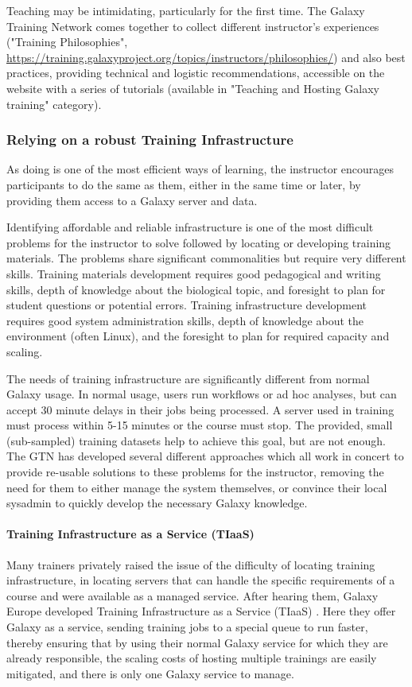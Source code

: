 \documentclass[10pt,letterpaper]{article}
\begin{document}
Teaching may be intimidating, particularly for the first time. The Galaxy Training Network comes together to collect different instructor’s experiences ("Training Philosophies", \url{https://training.galaxyproject.org/topics/instructors/philosophies/}) and also best practices, providing technical and logistic recommendations, accessible on the website with a series of tutorials (available in "Teaching and Hosting Galaxy training" category).

\subsubsection*{Relying on a robust Training Infrastructure}

As doing is one of the most efficient ways of learning, the instructor encourages participants to do the same as them, either in the same time or later, by providing them access to a Galaxy server and data.

Identifying affordable and reliable infrastructure is one of the most difficult problems for the instructor to solve followed by locating or developing training materials.
The problems share significant commonalities but require very different skills.
Training materials development requires good pedagogical and writing skills, depth of knowledge about the biological topic, and foresight to plan for student questions or potential errors.
Training infrastructure development requires good system administration skills, depth of knowledge about the environment (often Linux), and the foresight to plan for required capacity and scaling.

The needs of training infrastructure are significantly different from normal Galaxy usage. In normal usage, users run workflows or ad hoc analyses, but can accept 30 minute delays in their jobs being processed. A server used in training must process within 5-15 minutes or the course must stop. 
The provided, small (sub-sampled) training datasets help to achieve this goal, but are not enough. The GTN has developed several different approaches which all work in concert to provide re-usable solutions to these problems for the instructor, removing the need for them to either manage the system themselves, or convince their local sysadmin to quickly develop the necessary Galaxy knowledge.

\paragraph*{Training Infrastructure as a Service (TIaaS)}
Many trainers privately raised the issue of the difficulty of locating training infrastructure, in locating servers that can handle the specific requirements of a course and were available as a managed service. After hearing them, Galaxy Europe developed Training Infrastructure as a Service (TIaaS) \cite{Rasche2020}. 
Here they offer Galaxy as a service, sending training jobs to a special queue to run faster, thereby ensuring that by using their normal Galaxy service for which they are already responsible, the scaling costs of hosting multiple trainings are easily mitigated, and there is only one Galaxy service to manage.
\end{document}
